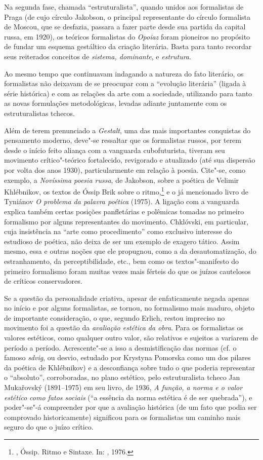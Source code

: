 Na segunda fase, chamada ``estruturalista'', quando unidos aos
formalistas de Praga (de cujo círculo Jakobson, o principal
representante do círculo formalista de Moscou, que se desfazia,
passara a fazer parte desde sua partida da capital russa, em 1920), os
teóricos formalistas do \emph{Opoiaz} foram pioneiros no propósito de
fundar um esquema gestáltico da criação literária. Basta para tanto
recordar seus reiterados conceitos de \emph{sistema, dominante}, e
\emph{estrutura}.

Ao mesmo tempo que continuavam indagando a natureza do fato literário,
os formalistas não deixavam de se preocupar com a ``evolução literária''
 (ligada à série histórica) e com as relações da arte com a sociedade, utilizando para
tanto as novas formulações metodológicas, levadas
adiante juntamente com os estruturalistas tchecos.

Além de terem prenunciado a \emph{Gestalt}, uma das
mais importantes conquistas do pensamento moderno, deve"-se ressaltar que
os formalistas russos, por terem desde o início feito aliança com a
vanguarda cubofuturista, tiveram seu movimento crítico"-teórico
fortalecido, revigorado e atualizado (até sua dispersão por volta dos
anos 1930), particularmente em relação à poesia. Cite"-se, como exemplo, a
\emph{Novíssima poesia russa}, de Jakobson, sobre a poética de Velimir
Khlébnikov, os textos de Óssip Brik sobre o ritmo,\footnote{, Óssip. Ritmo e Sintaxe. In: 
, 1976.} e o já mencionado
livro de Tyniánov \emph{O problema da palavra poética} (1975). A ligação com a
vanguarda explica também certas posições panfletárias e polêmicas
tomadas no primeiro formalismo por alguns representantes do movimento.
Chklóvski, em particular, cuja insistência na ``arte como
procedimento'' como exclusivo interesse do estudioso de
poética, não deixa de ser um exemplo de exagero tático. Assim mesmo, essa e outras noções que ele propugnou, como a
da desautomatização, do estranhamento, da perceptibilidade, etc., bem
como os textos"-manifesto do primeiro formalismo foram muitas vezes mais
férteis do que os juízos cautelosos de críticos conservadores.

Se a questão da personalidade criativa, apesar de enfaticamente negada apenas no início e por
alguns formalistas, se tornou, no formalismo mais
maduro, objeto de importante consideração, o que, segundo Erlich, restou impreciso no movimento foi a questão da
\emph{avaliação estética da obra}. Para os formalistas os valores
estéticos, como qualquer outro valor, são relativos e sujeitos a
variarem de período a período. Acrescente"-se a isso a desmistificação das
normas (cf. o famoso \emph{sdvig}, ou desvio, estudado por Krystyna
Pomorska como um dos pilares da poética de Khlébnikov) e a desconfiança
sobre tudo o que poderia representar o ``absoluto'', corroboradas,
no plano estético, pelo estruturalista tcheco Jan
Mukařovský (1891--1975) em seu livro, de 1936, \emph{A função, a norma e o valor
estético como fatos sociais} (``a essência da norma estética é de ser
quebrada''), e poder"-se"-á compreender por que a avaliação histórica (de
um fato que podia ser comprovado historicamente) significou para os
formalistas um caminho mais seguro do que o juízo crítico.

